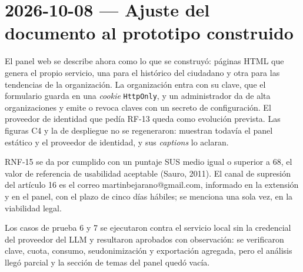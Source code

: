 \section{2026-10-08 — Ajuste del documento al prototipo construido}

El panel web se describe ahora como lo que se construyó: páginas HTML que genera el propio servicio, una para el histórico del ciudadano y otra para las tendencias de la organización. La organización entra con su clave, que el formulario guarda en una \textit{cookie} \texttt{HttpOnly}, y un administrador da de alta organizaciones y emite o revoca claves con un secreto de configuración. El proveedor de identidad que pedía RF-13 queda como evolución prevista. Las figuras C4 y la de despliegue no se regeneraron: muestran todavía el panel estático y el proveedor de identidad, y sus \textit{captions} lo aclaran.

RNF-15 se da por cumplido con un puntaje SUS medio igual o superior a 68, el valor de referencia de usabilidad aceptable (Sauro, 2011). El canal de supresión del artículo 16 es el correo martinbejarano@gmail.com, informado en la extensión y en el panel, con el plazo de cinco días hábiles; se menciona una sola vez, en la viabilidad legal.

Los casos de prueba 6 y 7 se ejecutaron contra el servicio local sin la credencial del proveedor del LLM y resultaron aprobados con observación: se verificaron clave, cuota, consumo, seudonimización y exportación agregada, pero el análisis llegó parcial y la sección de temas del panel quedó vacía.

\bigskip
